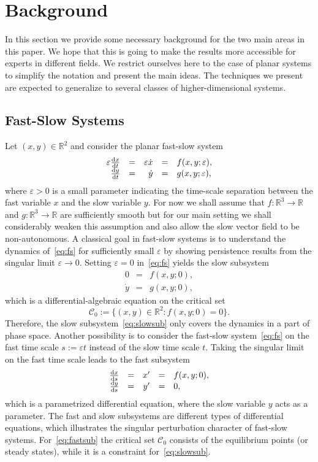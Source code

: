 \documentclass[12pt]{article}
\def\R{\mathbb{R}}
\def\txtd{{\textnormal{d}}}
\newcommand{\be}{\begin{equation}}
\newcommand{\ee}{\end{equation}}
\def\ra{\rightarrow}
\newcommand{\cC}{{\mathcal C}}  %
\begin{document}
\section{Background}
\label{sec:background}

In this section we provide some necessary background for the two main areas in this paper. 
We hope that this is going to make the results more accessible for experts in different 
fields. We restrict ourselves here to the case of planar systems to simplify the notation 
and present the main ideas. The techniques we present are expected to generalize to 
several classes of higher-dimensional systems.
  
\subsection{Fast-Slow Systems}
\label{ssec:fastslow}

Let $(x,y)\in\R^2$ and consider the planar fast-slow system
\be
\label{eq:fs}
\begin{array}{rcrcl}
\varepsilon \frac{\txtd x}{\txtd t} &=& \varepsilon \dot{x} &=& f(x,y;\varepsilon),\\
\frac{\txtd y}{\txtd t} &=& \dot{y} &=& g(x,y;\varepsilon),
\end{array}
\ee
where $\varepsilon>0$ is a small parameter indicating the time-scale separation 
between the fast variable $x$ and the slow variable $y$. For now we shall assume 
that $f:\R^3\ra \R$ and $g:\R^3\ra \R$ are sufficiently smooth but for our main 
setting we shall considerably weaken this assumption and also allow the slow vector
field to be non-autonomous. A classical goal in fast-slow systems is to understand 
the dynamics of~\eqref{eq:fs} for sufficiently small $\varepsilon$ by 
showing persistence results from the singular limit $\varepsilon\ra 0$. 
Setting $\varepsilon=0$ in~\eqref{eq:fs} yields the slow subsystem
\be
\label{eq:slowsub}
\begin{array}{rcl}
0 &=& f(x,y;0),\\
\dot{y} &=& g(x,y;0),
\end{array}
\ee
which is a differential-algebraic equation on the critical set 
\be
\cC_0:=\{(x,y)\in\R^2:f(x,y;0)=0\}.
\ee
Therefore, the slow subsystem~\eqref{eq:slowsub} only covers the dynamics in a part 
of phase space. Another possibility is to consider the fast-slow system~\eqref{eq:fs} 
on the fast time scale $s:=\varepsilon t$ instead of the slow time scale $t$. 
Taking the singular limit on the fast time scale leads to the fast subsystem  
\be
\label{eq:fastsub}
\begin{array}{rcrcl}
\frac{\txtd x}{\txtd s} &=& x' &=& f(x,y;0),\\
\frac{\txtd y}{\txtd s} &=& y' &=& 0,\\
\end{array}
\ee
which is a parametrized differential equation, where the slow variable $y$ acts as 
a parameter. The fast and slow subsystems are different types of differential 
equations, which illustrates the singular perturbation character of fast-slow systems. 
For~\eqref{eq:fastsub} the critical set $\cC_0$ consists of the equilibrium points (or 
steady states), while it is a constraint for~\eqref{eq:slowsub}.\medskip
\end{document}
